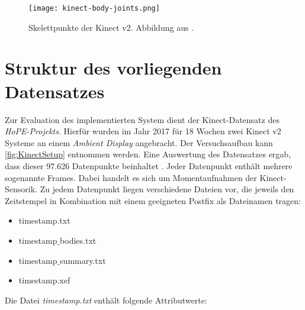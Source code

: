 \begin{figure}[ht]
  \begin{center}
  \texttt{[image: kinect-body-joints.png]}
  \end{center}
  \caption{Skelettpunkte der Kinect v2. Abbildung aus \citet{windows-developer-center_microsoft_corporation_human_2014}.}
  \label{fig:KinectBodyJoints}
\end{figure}


\section{Struktur des vorliegenden Datensatzes}
\label{chapter1-StrukturDatensatz}
Zur Evaluation des implementierten System dient der Kinect-Datensatz des \emph{HoPE-Projekts}.
Hierfür wurden im Jahr 2017 für 18 Wochen zwei Kinect v2 Systeme an einem \emph{Ambient Display} angebracht.
Der Versuchsaufbau kann \autoref{fig:KinectSetup} entnommen werden.
Eine Auswertung des Datensatzes ergab, dass dieser 97.626 Datenpunkte beinhaltet \citep{temiz_konzeption_2022}.
Jeder Datenpunkt enthält mehrere sogenannte Frames.
Dabei handelt es sich um Momentaufnahmen der Kinect-Sensorik.
Zu jedem Datenpunkt liegen verschiedene Dateien vor,
die jeweils den Zeitstempel in Kombination mit einem geeigneten Postfix als Dateinamen tragen:

\begin{itemize}
  \item timestamp.txt
  \item timestamp$\_$bodies.txt
  \item timestamp$\_$summary.txt
  \item timestamp.xef
\end{itemize}

Die Datei \emph{timestamp.txt} enthält folgende Attributwerte:

